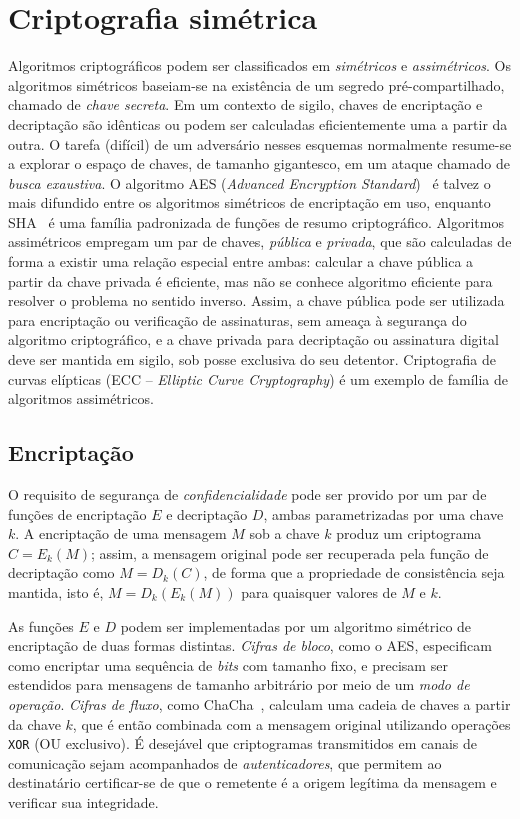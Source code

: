 \section{Criptografia simétrica}

Algoritmos criptográficos podem ser classificados em \emph{simétricos} e \emph{assimétricos}. Os algoritmos simétricos baseiam-se na existência de um segredo pré-compartilhado, chamado de \emph{chave secreta}. Em um contexto de sigilo, chaves de encriptação e decriptação são idênticas ou podem ser calculadas eficientemente uma a partir da outra. O tarefa (difícil) de um adversário nesses esquemas normalmente resume-se a explorar o espaço de chaves, de tamanho gigantesco, em um ataque chamado de \emph{busca exaustiva}. O algoritmo AES (\emph{Advanced Encryption Standard})~\cite{AES} é talvez o mais difundido entre os algoritmos simétricos de encriptação em uso, enquanto SHA~\cite{SHA2} é uma família padronizada de funções de resumo criptográfico. Algoritmos assimétricos empregam um par de chaves, \emph{pública} e \emph{privada}, que são calculadas de forma a existir uma relação especial entre ambas: calcular a chave pública a partir da chave privada é eficiente, mas não se conhece algoritmo eficiente para resolver o problema no sentido inverso. Assim, a chave pública pode ser utilizada para encriptação ou verificação de assinaturas, sem ameaça à segurança do algoritmo criptográfico, e a chave privada para decriptação ou assinatura digital deve ser mantida em sigilo, sob posse exclusiva do seu detentor. Criptografia de curvas elípticas (ECC -- \emph{Elliptic Curve Cryptography}) é um exemplo de família de algoritmos assimétricos.

\subsection{Encriptação}

O requisito de segurança de \emph{confidencialidade} pode ser provido por um par de funções de encriptação $E$ e decriptação $D$, ambas parametrizadas por uma chave $k$. A encriptação de uma mensagem $M$ sob a chave $k$ produz um criptograma $C = E_k(M)$; assim, a mensagem original pode ser recuperada pela função de decriptação como $M = D_k(C)$, de forma que a propriedade de consistência seja mantida, isto é, $M = D_k(E_k(M))$ para quaisquer valores de $M$ e $k$.

As funções $E$ e $D$ podem ser implementadas por um algoritmo simétrico de encriptação de duas formas distintas. \emph{Cifras de bloco}, como o AES, especificam como encriptar uma sequência de \emph{bits} com tamanho fixo, e precisam ser estendidos para mensagens de tamanho arbitrário por meio de um \emph{modo de operação}. \emph{Cifras de fluxo}, como ChaCha~\cite{Chachaspec}, calculam uma cadeia de chaves a partir da chave $k$, que é então combinada com a mensagem original utilizando operações \texttt{XOR} (OU exclusivo). É desejável que criptogramas transmitidos em canais de comunicação sejam acompanhados de \emph{autenticadores}, que permitem ao destinatário certificar-se de que o remetente é a origem legítima da mensagem e verificar sua integridade.

